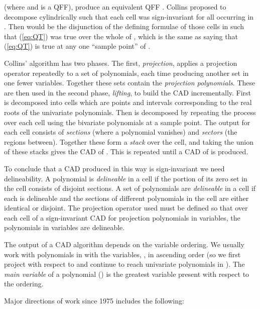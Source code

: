 \documentclass{article}
\begin{document}
(where  and  is a QFF), produce an equivalent QFF . Collins proposed to decompose  cylindrically such that each cell was sign-invariant for all  occurring in . Then  would be the disjunction of the defining formulae of those cells  in  such that (\ref{eq:QT}) was true over the whole of , which is the same as saying that (\ref{eq:QT}) is true at any one ``sample point'' of .
\par
Collins' algorithm has two phases.  The first, \textit{projection}, applies a projection operator repeatedly to a set of polynomials, each time producing another set in one fewer variables.  Together these sets contain the {\em projection polynomials}.
These are then used in the second phase, \textit{lifting}, to build the CAD incrementally.  First  is decomposed into cells which are points and intervals corresponding to the real roots of the univariate polynomials.  Then  is decomposed by repeating the process over each cell using the bivariate polynomials at a sample point.  The output for each cell consists of {\em sections} (where a polynomial vanishes) and {\em sectors} (the regions between). Together these form a {\em stack} over the cell, and taking the union of these stacks gives the CAD of .  This is repeated until a CAD of  is produced.  
\par
To conclude that a CAD produced in this way is sign-invariant we need delineability.  A polynomial is {\em delineable} in a cell if the portion of its zero set in the cell consists of disjoint sections.  A set of polynomials are {\em delineable} in a cell if each is delineable and the sections of different polynomials in the cell are either identical or disjoint.  The projection operator used must be defined so that over each cell of a sign-invariant CAD for projection polynomials in  variables, the polynomials in  variables are delineable.
\par
The output of a CAD algorithm depends on the variable ordering.  We usually work with polynomials in  with the variables, , in ascending order (so we first project with respect to  and continue to reach  univariate polynomials in ).  The \textit{main variable} of a polynomial () is the greatest variable present with respect to the ordering. 
\par
Major directions of work since 1975 includes the following:
\end{document}
